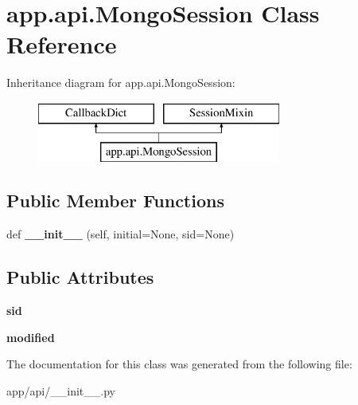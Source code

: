 \hypertarget{classapp_1_1api_1_1_mongo_session}{}\section{app.\+api.\+Mongo\+Session Class Reference}
\label{classapp_1_1api_1_1_mongo_session}
Inheritance diagram for app.\+api.\+Mongo\+Session\+:\begin{figure}[H]
\begin{center}
\leavevmode
\includegraphics[height=2.000000cm]{classapp_1_1api_1_1_mongo_session}
\end{center}
\end{figure}
\subsection*{Public Member Functions}
\begin{DoxyCompactItemize}
\item 
\mbox{\label{classapp_1_1api_1_1_mongo_session_a1e74504f3e5740e1e73c3e4bb7df813e}} 
def {\bfseries \+\_\+\+\_\+init\+\_\+\+\_\+} (self, initial=None, sid=None)
\end{DoxyCompactItemize}
\subsection*{Public Attributes}
\begin{DoxyCompactItemize}
\item 
\mbox{\label{classapp_1_1api_1_1_mongo_session_aebb40437167f78bf2412fc881b99b922}} 
{\bfseries sid}
\item 
\mbox{\label{classapp_1_1api_1_1_mongo_session_aa2b4eb7596abcbeba363be574f3f8c7c}} 
{\bfseries modified}
\end{DoxyCompactItemize}


The documentation for this class was generated from the following file\+:\begin{DoxyCompactItemize}
\item 
app/api/\+\_\+\+\_\+init\+\_\+\+\_\+.\+py\end{DoxyCompactItemize}

